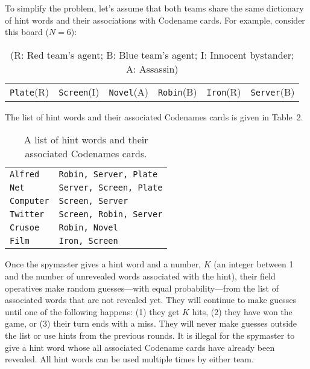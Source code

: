 To simplify the problem, let's assume that both teams share the same dictionary of hint words and their associations with Codename cards. For example, consider this board ($N = 6$):\\

\begin{table}[h!]
    \begin{centering}
        \begin{tabular}{llllll}
            {\tt Plate}(R) & {\tt Screen}(I) & {\tt Novel}(A) & {\tt Robin}(B) & {\tt Iron}(R) & {\tt Server}(B)
        \end{tabular}
        \label{table:codenameCards}
        \caption{(R: Red team's agent; B: Blue team's agent; I: Innocent bystander; A: Assassin)}
    \end{centering}
\end{table}


The list of hint words and their associated Codenames cards is given in Table~2.

\begin{table}[h!]
    \begin{centering}
        \begin{tabular}{|l|l|}
            \hline
            {\tt Alfred}&{\tt Robin, Server, Plate} \\
            {\tt Net}&{\tt Server, Screen, Plate} \\
            {\tt Computer}&{\tt Screen, Server} \\
            {\tt Twitter}&{\tt Screen, Robin, Server} \\
            {\tt Crusoe}&{\tt Robin, Novel} \\
            {\tt Film}&{\tt Iron, Screen} \\
            \hline
        \end{tabular}
        \label{table:codenameHints}
        \caption{A list of hint words and their associated Codenames cards.}
    \end{centering}
\end{table}

Once the spymaster gives a hint word and a number, $K$ (an integer between 1 and the number of unrevealed words associated with the hint), their field operatives make random guesses---with equal probability---from the list of associated words that are not revealed yet. They will continue to make guesses until one of the following happens: (1) they get $K$ hits, (2) they have won the game, or (3) their turn ends with a miss. They will never make guesses outside the list or use hints from the previous rounds. It is illegal for the spymaster to give a hint word whose all associated Codename cards have already been revealed. All hint words can be used multiple times by either team.


